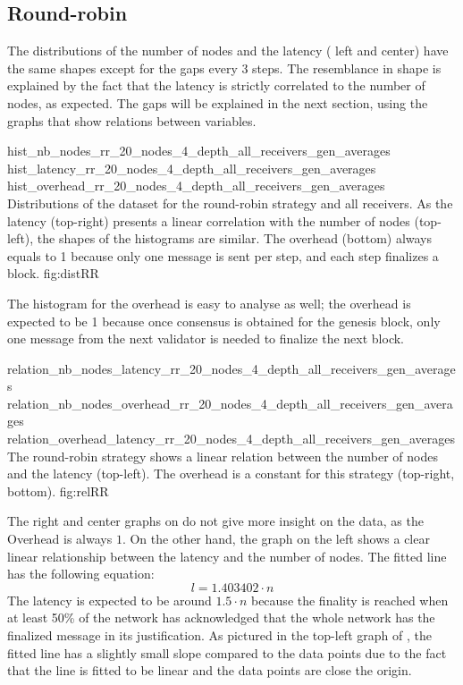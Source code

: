 
\subsection{Round-robin}

\FloatBarrier

The distributions of the number of nodes and the latency
( left and center) have the same
shapes except for the gaps every 3 steps. The resemblance in shape is explained
by the fact that the latency is strictly correlated to the number of nodes, as
expected.
The gaps will be explained in the next section, using the graphs that show
relations between variables. 

\triplefigure
    {hist_nb_nodes_rr_20_nodes_4_depth_all_receivers_gen_averages}
    {hist_latency_rr_20_nodes_4_depth_all_receivers_gen_averages}
    {hist_overhead_rr_20_nodes_4_depth_all_receivers_gen_averages}
    {Distributions of the dataset for the round-robin strategy and all
    receivers. As the latency (top-right) presents a linear correlation with the number of
    nodes (top-left), the shapes of the histograms are similar. The overhead
    (bottom) always
    equals to 1 because only one message is sent per step, and each step
    finalizes a block.}
    {fig:distRR}

The histogram for the overhead is easy to analyse as well; the overhead is
expected to be 1 because once consensus is obtained for the genesis block, only
one message from the next validator is needed to finalize the next block.

\triplefigure
    {relation_nb_nodes_latency_rr_20_nodes_4_depth_all_receivers_gen_averages}
    {relation_nb_nodes_overhead_rr_20_nodes_4_depth_all_receivers_gen_averages}
    {relation_overhead_latency_rr_20_nodes_4_depth_all_receivers_gen_averages}
    {The round-robin strategy shows a linear relation between the number of
    nodes and the latency (top-left). The overhead is a constant for this
    strategy (top-right, bottom).}
    {fig:relRR}

The right and center graphs on  do not give more insight on the
data, as the Overhead is always \(1\). On the other hand, the graph on the left
shows a clear linear relationship between the latency and the number of nodes.
The fitted line has the following equation:
\[l = 1.403402\cdot n\]
The latency is expected to be around \(1.5\cdot n\) because the finality is
reached when at least 50\% of the network has acknowledged that the whole
network has the finalized message in its justification. As pictured in the
top-left graph of , the fitted line has a slightly small
slope compared to the data points due to the fact that the line is fitted to be
linear and the data points are close the origin. 

